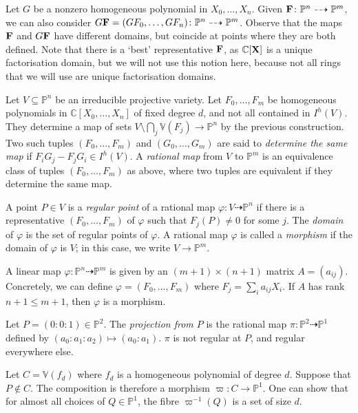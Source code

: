 Let \( G \) be a nonzero homogeneous polynomial in \( X_0, \dots, X_n \).
Given \( \vb F \colon \mathbb P^n \dashrightarrow \mathbb P^m \), we can also consider \( G\vb F = (GF_0, \dots, GF_n) \colon \mathbb P^n \dashrightarrow \mathbb P^m \).
Observe that the maps \( \vb F \) and \( G\vb F \) have different domains, but coincide at points where they are both defined.
Note that there is a `best' representative \( \vb F \), as \( \mathbb C[\vb X] \) is a unique factorisation domain, but we will not use this notion here, because not all rings that we will use are unique factorisation domains.
\begin{definition}
    Let \( V \subseteq \mathbb P^n \) be an irreducible projective variety.
    Let \( F_0, \dots, F_m \) be homogeneous polynomials in \( \mathbb C[X_0, \dots, X_n] \) of fixed degree \( d \), and not all contained in \( I^h(V) \).
    They determine a map of sets \( V \setminus \bigcap_j \mathbb V(F_j) \to \mathbb P^n \) by the previous construction.
    Two such tuples \( (F_0, \dots, F_m) \) and \( (G_0, \dots, G_m) \) are said to \emph{determine the same map} if \( F_i G_j - F_j G_i \in I^h(V) \).
    A \emph{rational map} from \( V \) to \( \mathbb P^m \) is an equivalence class of tuples \( (F_0, \dots, F_m) \) as above, where two tuples are equivalent if they determine the same map.
\end{definition}
\begin{definition}
    A point \( P \in V \) is a \emph{regular point} of a rational map \( \varphi \colon V \dashrightarrow \mathbb P^n \) if there is a representative \( (F_0, \dots, F_m) \) of \( \varphi \) such that \( F_j(P) \neq 0 \) for some \( j \).
    The \emph{domain} of \( \varphi \) is the set of regular points of \( \varphi \).
    A rational map \( \varphi \) is called a \emph{morphism} if the domain of \( \varphi \) is \( V \); in this case, we write \( V \to \mathbb P^m \).
\end{definition}
\begin{example}
    A linear map \( \varphi \colon \mathbb P^n \dashrightarrow \mathbb P^m \) is given by an \( (m + 1) \times (n + 1) \) matrix \( A = (a_{ij}) \).
    Concretely, we can define \( \varphi = (F_0, \dots, F_m) \) where \( F_j = \sum_i a_{ij} X_i \).
    If \( A \) has rank \( n + 1 \leq m + 1 \), then \( \varphi \) is a morphism.
\end{example}
\begin{example}
    Let \( P = (0 : 0 : 1) \in \mathbb P^2 \).
    The \emph{projection from \( P \)} is the rational map \( \pi \colon \mathbb P^2 \dashrightarrow \mathbb P^1 \) defined by \( (a_0 : a_1 : a_2) \mapsto (a_0 : a_1) \).
    \( \pi \) is not regular at \( P \), and regular everywhere else.

    Let \( C = \mathbb V(f_d) \) where \( f_d \) is a homogeneous polynomial of degree \( d \).
    Suppose that \( P \not\in C \).
    The composition is therefore a morphism \( \varpi \colon C \to \mathbb P^1 \).
    One can show that for almost all choices of \( Q \in \mathbb P^1 \), the fibre \( \varpi^{-1}(Q) \) is a set of size \( d \).
\end{example}
